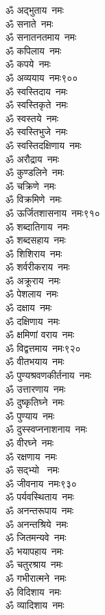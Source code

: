\begin{multicols}{2}
\begin{flushleft}
ॐ अद्भुताय~नमः\\
ॐ सनाते~नमः\\
ॐ सनातनतमाय~नमः\\
ॐ कपिलाय~नमः\\
ॐ कपये~नमः\\
ॐ अव्ययाय~नमः\hfill ९००\\
ॐ स्वस्तिदाय~नमः\\
ॐ स्वस्तिकृते~नमः\\
ॐ स्वस्तये~नमः\\
ॐ स्वस्तिभुजे~नमः\\
ॐ स्वस्तिदक्षिणाय~नमः\\
ॐ अरौद्राय~नमः\\
ॐ कुण्डलिने~नमः\\
ॐ चक्रिणे~नमः\\
ॐ विक्रमिणे~नमः\\
ॐ ऊर्जितशासनाय~नमः\hfill ९१०\\
ॐ शब्दातिगाय~नमः\\
ॐ शब्दसहाय~नमः\\
ॐ शिशिराय~नमः\\
ॐ शर्वरीकराय~नमः\\
ॐ अक्रूराय~नमः\\
ॐ पेशलाय~नमः\\
ॐ दक्षाय~नमः\\
ॐ दक्षिणाय~नमः\\
ॐ क्षमिणां वराय~नमः\\
ॐ विद्वत्तमाय~नमः\hfill ९२०\\
ॐ वीतभयाय~नमः\\
ॐ पुण्यश्रवणकीर्तनाय~नमः\\
ॐ उत्तारणाय~नमः\\
ॐ दुष्कृतिघ्ने~नमः\\
ॐ पुण्याय~नमः\\
ॐ दुस्स्वप्ननाशनाय~नमः\\
ॐ वीरघ्ने~नमः\\
ॐ रक्षणाय~नमः\\
ॐ सद्भ्यो ~नमः\\
ॐ जीवनाय~नमः\hfill ९३०\\
ॐ पर्यवस्थिताय~नमः\\
ॐ अनन्तरूपाय~नमः\\
ॐ अनन्तश्रिये~नमः\\
ॐ जितमन्यवे~नमः\\
ॐ भयापहाय~नमः\\
ॐ चतुरश्राय~नमः\\
ॐ गभीरात्मने~नमः\\
ॐ विदिशाय~नमः\\
ॐ व्यादिशाय~नमः\\

\end{flushleft}
\end{multicols}
